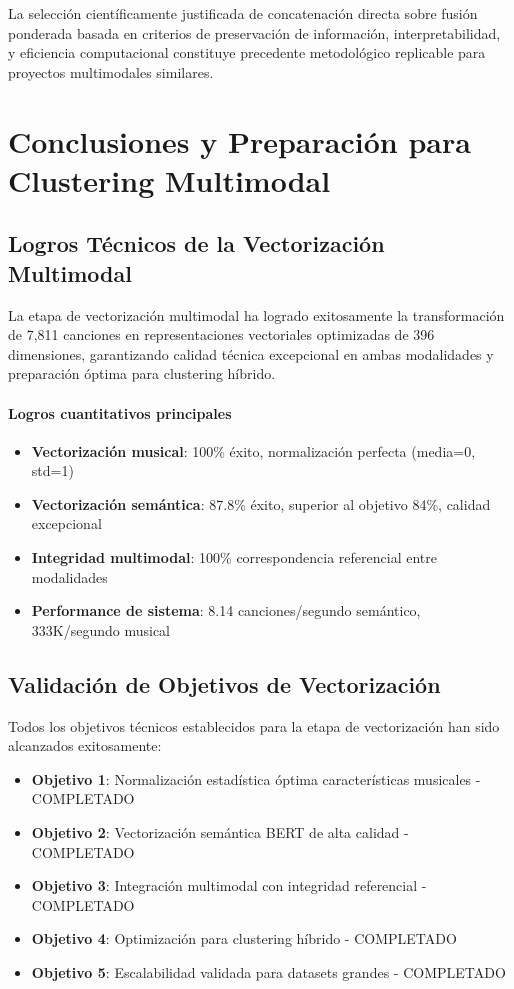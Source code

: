 \documentclass[12pt,a4paper]{report}
\begin{document}
La selección científicamente justificada de concatenación directa sobre fusión ponderada basada en criterios de preservación de información, interpretabilidad, y eficiencia computacional constituye precedente metodológico replicable para proyectos multimodales similares.

\section{Conclusiones y Preparación para Clustering Multimodal}

\subsection{Logros Técnicos de la Vectorización Multimodal}

La etapa de vectorización multimodal ha logrado exitosamente la transformación de 7,811 canciones en representaciones vectoriales optimizadas de 396 dimensiones, garantizando calidad técnica excepcional en ambas modalidades y preparación óptima para clustering híbrido.

\paragraph{Logros cuantitativos principales}
\begin{itemize}
    \item \textbf{Vectorización musical}: 100\% éxito, normalización perfecta (media=0, std=1)
    \item \textbf{Vectorización semántica}: 87.8\% éxito, superior al objetivo 84\%, calidad excepcional
    \item \textbf{Integridad multimodal}: 100\% correspondencia referencial entre modalidades
    \item \textbf{Performance de sistema}: 8.14 canciones/segundo semántico, 333K/segundo musical
\end{itemize}

\subsection{Validación de Objetivos de Vectorización}

Todos los objetivos técnicos establecidos para la etapa de vectorización han sido alcanzados exitosamente:

\begin{itemize}
    \item \checkmark \textbf{Objetivo 1}: Normalización estadística óptima características musicales - COMPLETADO
    \item \checkmark \textbf{Objetivo 2}: Vectorización semántica BERT de alta calidad - COMPLETADO
    \item \checkmark \textbf{Objetivo 3}: Integración multimodal con integridad referencial - COMPLETADO
    \item \checkmark \textbf{Objetivo 4}: Optimización para clustering híbrido - COMPLETADO
    \item \checkmark \textbf{Objetivo 5}: Escalabilidad validada para datasets grandes - COMPLETADO
\end{itemize}
\end{document}

